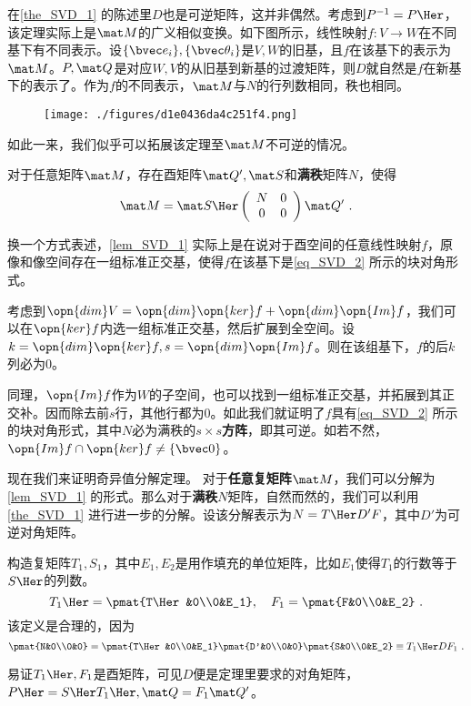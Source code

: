 在\autoref{the_SVD_1} 的陈述里$D$也是可逆矩阵，这并非偶然。考虑到$P^{-1}=P\Her $，该定理实际上是$\mat M$的广义相似变换。如下图所示，线性映射$f:V\rightarrow W$在不同基下有不同表示。设$\{\bvec e_i\},\{\bvec \theta_i\}$是$V,W$的旧基，且$f$在该基下的表示为$\mat M$。$P,\mat Q$是对应$W,V$的从旧基到新基的过渡矩阵，则$D$就自然是$f$在新基下的表示了。作为$f$的不同表示，$\mat M$与$N$的行列数相同，秩也相同。
\begin{figure}[ht]
\centering
\texttt{[image: ./figures/d1e0436da4c251f4.png]}
\caption{} \label{fig_SVD_2}
\end{figure}
如此一来，我们似乎可以拓展该定理至$\mat M$不可逆的情况。

\begin{lemma}{}\label{lem_SVD_1}
对于任意矩阵$\mat M$，存在酉矩阵$\mat Q',\mat S$和\textbf{满秩}矩阵$N$，使得
\begin{equation}\label{eq_SVD_2}
\mat M=\mat S\Her \left(\begin{array}{cc}
N & 0 \\
0 & 0
\end{array}\right) \mat Q'~.
\end{equation}
\end{lemma}


换一个方式表述，\autoref{lem_SVD_1} 实际上是在说对于酉空间的任意线性映射$f$，原像和像空间存在一组标准正交基，使得$f$在该基下是\autoref{eq_SVD_2} 所示的块对角形式。

考虑到$\opn{dim}V=\opn{dim}\opn{ker}f+\opn{dim}\opn{Im}f$，我们可以在$\opn{ker}f$内选一组标准正交基，然后扩展到全空间。设$k=\opn{dim}\opn{ker}f,s=\opn{dim}\opn{Im}f$。则在该组基下，$f$的后$k$列必为$0$。

同理，$\opn{Im}f$作为$W$的子空间，也可以找到一组标准正交基，并拓展到其正交补。因而除去前$s$行，其他行都为$0$。如此我们就证明了$f$具有\autoref{eq_SVD_2} 所示的块对角形式，其中$N$必为满秩的$s\times s$\textbf{方阵}，即其可逆。如若不然，$\opn{Im}f\cap\opn{ker}f\neq\{\bvec 0\}$。

现在我们来证明奇异值分解定理。
对于\textbf{任意复矩阵}$\mat M$，我们可以分解为\autoref{lem_SVD_1} 的形式。那么对于\textbf{满秩}$N$矩阵，自然而然的，我们可以利用\autoref{the_SVD_1} 进行进一步的分解。设该分解表示为$N=T\Her D'F$，其中$D'$为可逆对角矩阵。

构造复矩阵$T_1,S_1$，其中$E_1,E_2$是用作填充的单位矩阵，比如$E_1$使得$T_1$的行数等于$S\Her $的列数。
\begin{equation}
T_1\Her =\pmat{T\Her &0\\0&E_1},\quad F_1=\pmat{F&0\\0&E_2}
~.
\end{equation}
该定义是合理的，因为
\begin{equation}
\pmat{N&0\\0&0}=\pmat{T\Her &0\\0&E_1}\pmat{D'&0\\0&0}\pmat{S&0\\0&E_2}\equiv T_1\Her DF_1~.
\end{equation}

易证$T_1\Her ,F_1$是酉矩阵，可见$D$便是定理里要求的对角矩阵，$P\Her =S\Her T_1\Her ,\mat Q=F_1\mat Q'$。
